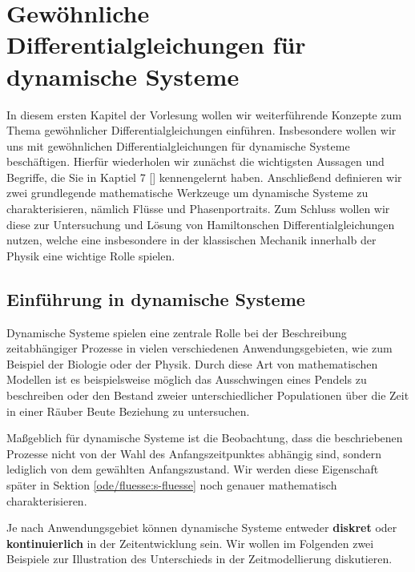 \chapter{Gewöhnliche Differentialgleichungen für dynamische Systeme}
\label{\detokenize{ode/ode:gewohnliche-differentialgleichungen-fur-dynamische-systeme}}\label{\detokenize{ode/ode::doc}}
In diesem ersten Kapitel der Vorlesung wollen wir weiterführende Konzepte zum Thema gewöhnlicher Differentialgleichungen einführen.
Insbesondere wollen wir uns mit gewöhnlichen Differentialgleichungen für dynamische Systeme beschäftigen.
Hierfür wiederholen wir zunächst die wichtigsten Aussagen und Begriffe, die Sie in Kaptiel 7 {[}{]} kennengelernt haben.
Anschließend definieren wir zwei grundlegende mathematische Werkzeuge um dynamische Systeme zu charakterisieren, nämlich Flüsse und Phasenportraits.
Zum Schluss wollen wir diese zur Untersuchung und Lösung von Hamiltonschen Differentialgleichungen nutzen, welche eine insbesondere in der klassischen Mechanik innerhalb der Physik eine wichtige Rolle spielen.


\section{Einführung in dynamische Systeme}
\label{\detokenize{ode/dynamicSystems:einfuhrung-in-dynamische-systeme}}\label{\detokenize{ode/dynamicSystems::doc}}
Dynamische Systeme spielen eine zentrale Rolle bei der Beschreibung zeitabhängiger Prozesse in vielen verschiedenen Anwendungsgebieten, wie zum Beispiel der Biologie oder der Physik.
Durch diese Art von mathematischen Modellen ist es beispielsweise möglich das Ausschwingen eines Pendels zu beschreiben oder den Bestand zweier unterschiedlicher Populationen über die Zeit in einer Räuber Beute Beziehung zu untersuchen.

Maßgeblich für dynamische Systeme ist die Beobachtung, dass die beschriebenen Prozesse nicht von der Wahl des Anfangszeitpunktes abhängig sind, sondern lediglich von dem gewählten Anfangszustand.
Wir werden diese Eigenschaft später in Sektion \cref{ode/fluesse:s-fluesse}  noch genauer mathematisch charakterisieren.

Je nach Anwendungsgebiet können dynamische Systeme entweder \textbf{diskret} oder \textbf{kontinuierlich} in der Zeitentwicklung sein.
Wir wollen im Folgenden zwei Beispiele zur Illustration des Unterschieds in der Zeitmodellierung diskutieren.


